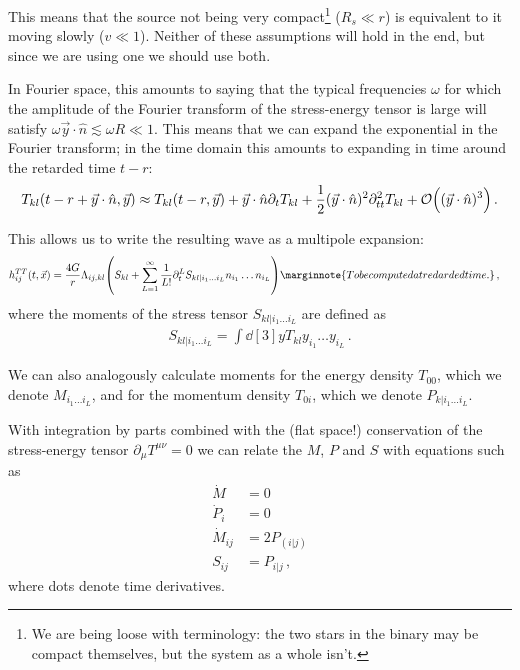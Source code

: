 \documentclass[main.tex]{subfiles}
\begin{document}
This means that the source not being very compact\footnote{We are being loose with terminology: the two stars in the binary may be compact themselves, but the system as a whole isn't. } (\(R_s \ll r\)) is equivalent to it moving slowly (\(v \ll 1\)). 
Neither of these assumptions will hold in the end, but since we are using one we should use both. 

In Fourier space, this amounts to saying that the typical frequencies \(\omega \) for which the amplitude of the Fourier transform of the stress-energy tensor is large will satisfy \(\omega \vec{y} \cdot \hat{n} \lesssim \omega R \ll 1\). 
This means that we can expand the exponential in the Fourier transform; in the time domain this amounts to expanding in time around the retarded time \(t - r\): 
%
\begin{align}
T_{kl} (t-r + \vec{y} \cdot \hat{n}, \vec{y}) \approx T_{kl} (t-r, \vec{y}) + \vec{y} \cdot \hat{n} \partial_{t} T_{kl} + \frac{1}{2} (\vec{y} \cdot \hat{n})^2 \partial^2_{tt} T_{kl} + \order{(\vec{y} \cdot \hat{n})^3}
\,.
\end{align}

This allows us to write the resulting wave as a multipole expansion:
%
\begin{align} \label{eq:gw-expansion-moments-stess-tensor}
h_{ij}^{TT} (t, \vec{x}) &= \frac{4G}{r} \Lambda_{ij, kl} \qty(S_{kl} + \sum_{L=1}^{\infty } \frac{1}{L!} \partial_{t}^{L} S_{kl | i_1 \dots i_L} n_{i_1} \dots n_{i_L})
\marginnote{To be computed at redarded time.}
\,,
\end{align}
%
where the moments of the stress tensor \(S_{kl|i_1 \dots i_L}\) are defined as 
%
\begin{align}
S_{kl | i_1 \dots i_L} = \int \dd[3]{y} T_{kl} y_{i_1} \dots y_{i_L}
\,.
\end{align}

We can also analogously calculate moments for the energy density \(T_{00} \), which we denote \(M_{i_1 \dots i_L}\), and for the momentum density \(T_{0i}\), which we denote \(P_{k|i_1 \dots i_L}\). 

With integration by parts combined with the (flat space!) conservation of the stress-energy tensor \(\partial_{\mu } T^{\mu \nu }= 0\) we can relate the \(M\), \(P\) and \(S\) with equations such as \cite[eqs.\ 3.45--51]{maggioreGravitationalWavesVolume2007}
%
\begin{align}
\dot{M} &= 0  \\
\dot{P}_{i} &= 0 \\
\dot{M}_{ij} &= 2 P_{(i|j)}   \\
S_{ij} &= P_{i | j}
\,,
\end{align}
%
where dots denote time derivatives.
\end{document}
